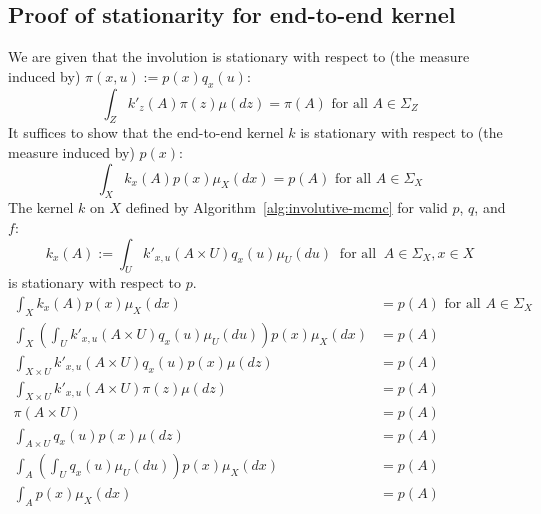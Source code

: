 \documentclass[twoside]{article}
\begin{document}
\subsection{Proof of stationarity for end-to-end kernel} \label{sec:involutive-mcmc-is-stationary}
We are given that the involution is stationary with respect to (the measure induced by) $\pi(x, u) := p(x) q_x(u)$:
\[
\int_Z k'_z(A) \pi(z) \mu(dz) = \pi(A) \mbox{ for all } A \in \Sigma_Z
\]
It suffices to show that the end-to-end kernel $k$ is stationary with respect to (the measure induced by) $p(x)$:
\[
\int_X k_x(A) p(x) \mu_X(dx) = p(A) \mbox{ for all } A \in \Sigma_X
\]
The kernel $k$ on $X$ defined by Algorithm~\ref{alg:involutive-mcmc} for valid $p$, $q$, and $f$:
\[
k_x(A) := \int_U k'_{x,u}(A \times U) q_x(u) \mu_U(du) \;\; \mbox{for all} \;\; A \in \Sigma_X, x \in X
\]
is stationary with respect to $p$.
\begin{align*}
    \int_X k_x(A) p(x) \mu_X(dx) &= p(A) \mbox{ for all } A \in \Sigma_X\\
    \int_X \left( \int_U k'_{x,u}(A \times U) q_x(u) \mu_U(du) \right) p(x) \mu_X(dx) &= p(A)\\
    \int_{X \times U} k'_{x,u}(A \times U) q_x(u) p(x) \mu(dz) &= p(A)\\
    \int_{X \times U} k'_{x,u}(A \times U) \pi(z) \mu(dz) &= p(A)\\
    \pi(A \times U) &= p(A)\\
    \int_{A \times U} q_x(u) p(x) \mu(dz) &= p(A)\\
    \int_A \left( \int_U q_x(u) \mu_U(du) \right) p(x) \mu_X(dx) &= p(A)\\
    \int_A p(x) \mu_X(dx) &= p(A)
\end{align*}
\end{document}
